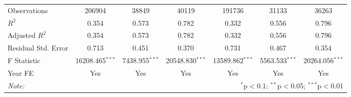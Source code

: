 \begin{tabular}{@{\extracolsep{5pt}}lcccccc}
    Observations        & 206904                                                               & 38849            & 40119             & 191736            & 31133            & 36263             \\
    $R^2$               & 0.354                                                                & 0.573            & 0.782             & 0.332             & 0.556            & 0.796             \\
    Adjusted $R^2$      & 0.354                                                                & 0.573            & 0.782             & 0.332             & 0.556            & 0.796             \\
    Residual Std. Error & 0.713                                                                & 0.451            & 0.370             & 0.731             & 0.467            & 0.354             \\
    F Statistic         & 16208.465$^{***}$                                                    & 7438.955$^{***}$ & 20548.830$^{***}$ & 13589.862$^{***}$ & 5563.533$^{***}$ & 20264.056$^{***}$ \\
    Year FE             & Yes                                                                  & Yes              & Yes               & Yes               & Yes              & Yes               \\
    \hline
    \hline
    \textit{Note:}      & \multicolumn{6}{r}{$^{*}$p$<$0.1; $^{**}$p$<$0.05; $^{***}$p$<$0.01}                                                                                                   \\
\end{tabular}
